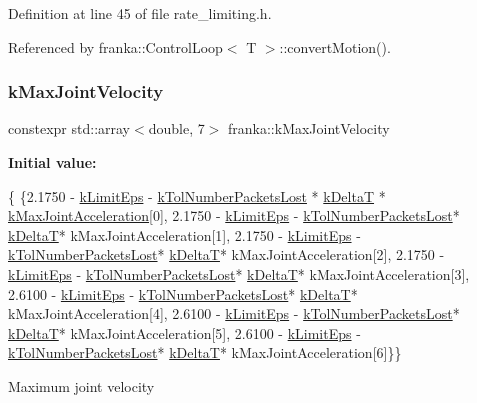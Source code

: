 Definition at line 45 of file rate\+\_\+limiting.\+h.



Referenced by franka\+::\+Control\+Loop$<$ T $>$\+::convert\+Motion().

\mbox{\label{namespacefranka_a6d451800a90b939422dc9c3fb103ca23}} 
\subsubsection{\texorpdfstring{k\+Max\+Joint\+Velocity}{kMaxJointVelocity}}
{\footnotesize\ttfamily constexpr std\+::array$<$double, 7$>$ franka\+::k\+Max\+Joint\+Velocity}

{\bfseries Initial value\+:}
\begin{DoxyCode}
\{
    \{2.1750 - \hyperlink{namespacefranka_aad1f9b575274830b8da9e638559d424b}{kLimitEps} - \hyperlink{namespacefranka_a664b546834ceecd4e3220ffa92f1172c}{kTolNumberPacketsLost} * 
      \hyperlink{namespacefranka_a1e207a0d5a6e90c1e1a78e6e1057120a}{kDeltaT} * \hyperlink{namespacefranka_a826ecf0b7d214df69c1ee416d3e66b93}{kMaxJointAcceleration}[0],
     2.1750 - \hyperlink{namespacefranka_aad1f9b575274830b8da9e638559d424b}{kLimitEps} - \hyperlink{namespacefranka_a664b546834ceecd4e3220ffa92f1172c}{kTolNumberPacketsLost}* 
      \hyperlink{namespacefranka_a1e207a0d5a6e90c1e1a78e6e1057120a}{kDeltaT}* kMaxJointAcceleration[1],
     2.1750 - \hyperlink{namespacefranka_aad1f9b575274830b8da9e638559d424b}{kLimitEps} - \hyperlink{namespacefranka_a664b546834ceecd4e3220ffa92f1172c}{kTolNumberPacketsLost}* 
      \hyperlink{namespacefranka_a1e207a0d5a6e90c1e1a78e6e1057120a}{kDeltaT}* kMaxJointAcceleration[2],
     2.1750 - \hyperlink{namespacefranka_aad1f9b575274830b8da9e638559d424b}{kLimitEps} - \hyperlink{namespacefranka_a664b546834ceecd4e3220ffa92f1172c}{kTolNumberPacketsLost}* 
      \hyperlink{namespacefranka_a1e207a0d5a6e90c1e1a78e6e1057120a}{kDeltaT}* kMaxJointAcceleration[3],
     2.6100 - \hyperlink{namespacefranka_aad1f9b575274830b8da9e638559d424b}{kLimitEps} - \hyperlink{namespacefranka_a664b546834ceecd4e3220ffa92f1172c}{kTolNumberPacketsLost}* 
      \hyperlink{namespacefranka_a1e207a0d5a6e90c1e1a78e6e1057120a}{kDeltaT}* kMaxJointAcceleration[4],
     2.6100 - \hyperlink{namespacefranka_aad1f9b575274830b8da9e638559d424b}{kLimitEps} - \hyperlink{namespacefranka_a664b546834ceecd4e3220ffa92f1172c}{kTolNumberPacketsLost}* 
      \hyperlink{namespacefranka_a1e207a0d5a6e90c1e1a78e6e1057120a}{kDeltaT}* kMaxJointAcceleration[5],
     2.6100 - \hyperlink{namespacefranka_aad1f9b575274830b8da9e638559d424b}{kLimitEps} - \hyperlink{namespacefranka_a664b546834ceecd4e3220ffa92f1172c}{kTolNumberPacketsLost}* 
      \hyperlink{namespacefranka_a1e207a0d5a6e90c1e1a78e6e1057120a}{kDeltaT}* kMaxJointAcceleration[6]\}\}
\end{DoxyCode}
Maximum joint velocity 

